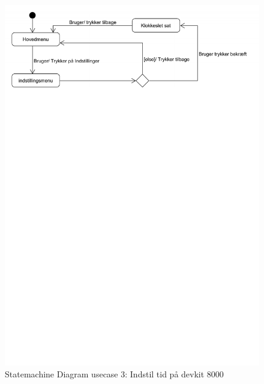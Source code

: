 \begin{figure}[H]
	\caption{Statemachine Diagram usecase 3: Indstil tid på devkit 8000}
	\label{STD:UC3-devkit}
	\includegraphics[scale=0.7,trim=10 600 100 0, clip]{Applikationsmodel_UC3/Statemachine_UC3}
\end{figure}

